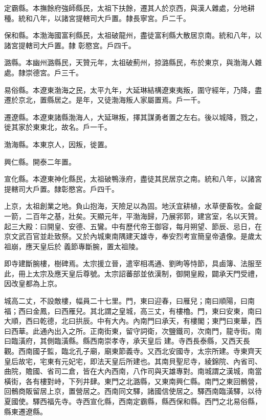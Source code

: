\begin{pinyinscope}
 定霸縣。本撫餘府強師縣民，太祖下扶餘，遷其人於京西，與漢人雜處，分地耕種。統和八年，以諸宮提轄司大戶置。隸長寧宮。戶二千。



 保和縣。本渤海國富利縣民，太祖破龍州，盡徒富利縣大散居京南。統和八年，以諸宮提轄司大戶置。隸
 彰愍宮。戶四千。



 潞縣。本幽州潞縣民，天贊元年，太祖破薊州，掠潞縣民，布於東京，與渤海人雜處。隸崇德宮。戶三千。



 易俗縣。本遼東渤海之民，太平九年，大延琳結構遼東夷叛，圍守經年，乃降，盡遷於京北，置縣居之。是年，又徒渤海叛人家屬置焉。戶一千。



 遷遼縣。本遼東諸縣渤海人，大延琳叛，擇其謀勇者置之左右。後以城降，戮之，徙其家於東東北，故名。戶一千。



 渤海縣。本東京人，因叛，徙置。



 興仁縣。開泰二年置。



 宣化縣。本遼東神化縣民，太祖破鴨淥府，盡徒其民居京之南。統和八年，以諸宮提轄司大戶置。隸彰愍宮。戶四千。



 上京，太祖創業之地。負山抱海，天險足以為固。地沃宜耕植，水草便畜牧。金齪一箭，二百年之基，壯矣。天顯元年，平渤海歸，乃展郛郭，建宮室，名以天贊。起三大殿：曰開皇、安德、五鸞。中有歷代帝王御容，每月朔望、節辰、忌日，在京文武百官並赴致祭。又於內城東南隅建天雄寺，奉安烈考宣簡皇帝遺像。是歲太祖崩，應天皇后於
 義節專斷腕，置太祖陵。



 即寺建斷腕樓，樹碑焉。太宗援立晉，遣宰相馮通、劉昫等恃節，具鹵簿、法服至此，冊上太宗及應天皇后尊號。太宗詔蕃部並依漢制，御開皇殿，闢承天門受禮，因改皇都為上京。



 城高二丈，不設敵樓，幅員二十七里。門，東曰迎春，曰雁兒；南曰順陽，曰南福；西曰金鳳，曰西雁兒。其北謂之皇城，高三丈，有樓櫓。門，東曰安東，南曰大順，西曰乾德，北曰拱辰。中有大內。內南門曰承天，有樓閣；東門曰東華，西曰西華。此通內出入之所。正南街東，留守詞衛，次鹽鐵司，次南門，龍寺街。南曰臨潢府，其側臨潢縣。縣西南崇孝寺，承天皇后
 建。寺西長泰縣，又西天長觀。西南國子監，臨北孔子廟，廟東節義寺。又西北安國寺，太宗所建。寺東齊天皇后故宅，宅東有元妃宅，即法天皇后所建也。其南貝聖尼寺，綾錦院、內省司、曲院，贍國、省司二倉，皆在大內西南，八作司與天雄專對。南城謂之漢城，南當橫街，各有樓對峙，下列井肆。東門之北潞縣，又東南興仁縣。南門之東回鶻營，回鶻商販留居上京，置營居之。西南同文驛，諸國信使居之。驛西南臨潢驛，以待夏國使。驛西福先寺。寺西宣化縣，西南定霸縣，縣西保和縣。西門之北易俗縣，縣東遷遼縣。




\end{pinyinscope}
